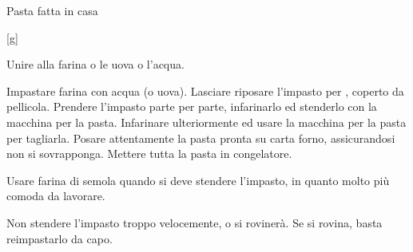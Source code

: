 \begin{recipe}{Pasta fatta in casa}
    \begin{header}
        [g]
    
    \end{header}
    
    \begin{introduction}
        Unire alla farina o le uova o l'acqua.
    \end{introduction}
    
    \begin{ingredients}
    \end{ingredients}
    
    \begin{preparation}
        \step Impastare farina con acqua (o uova).
        \step Lasciare riposare l'impasto per , coperto da pellicola.
        \step Prendere l'impasto parte per parte, infarinarlo ed stenderlo con la macchina per la pasta.
        \step Infarinare ulteriormente ed usare la macchina per la pasta per tagliarla.
        \step Posare attentamente la pasta pronta su carta forno, assicurandosi non si sovrapponga.
        \step Mettere tutta la pasta in congelatore.
    \end{preparation}
    
    \begin{suggestion}
        \suggestionMark Usare farina di semola quando si deve stendere l'impasto, in quanto molto più comoda da lavorare.
        
        \suggestionMark Non stendere l'impasto troppo velocemente, o si rovinerà.
            Se si rovina, basta reimpastarlo da capo.
    \end{suggestion}
\end{recipe}
